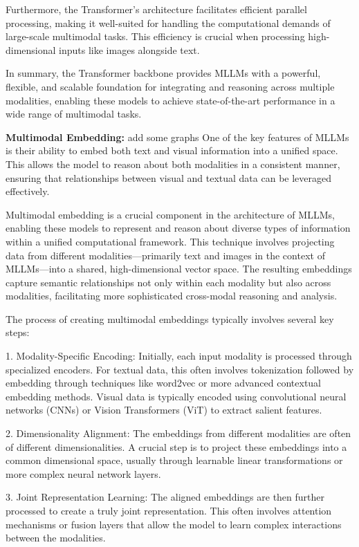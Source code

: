 Furthermore, the Transformer's architecture facilitates efficient parallel processing, making it well-suited for handling the computational demands of large-scale multimodal tasks. This efficiency is crucial when processing high-dimensional inputs like images alongside text.

In summary, the Transformer backbone provides MLLMs with a powerful, flexible, and scalable foundation for integrating and reasoning across multiple modalities, enabling these models to achieve state-of-the-art performance in a wide range of multimodal tasks.

\textbf{Multimodal Embedding:} {\color{red}add some graphs} One of the key features of MLLMs is their ability to embed both text and visual information into a unified space. This allows the model to reason about both modalities in a consistent manner, ensuring that relationships between visual and textual data can be leveraged effectively.

Multimodal embedding is a crucial component in the architecture of MLLMs, enabling these models to represent and reason about diverse types of information within a unified computational framework. This technique involves projecting data from different modalities—primarily text and images in the context of MLLMs—into a shared, high-dimensional vector space. The resulting embeddings capture semantic relationships not only within each modality but also across modalities, facilitating more sophisticated cross-modal reasoning and analysis.

The process of creating multimodal embeddings typically involves several key steps:

1. Modality-Specific Encoding: Initially, each input modality is processed through specialized encoders. For textual data, this often involves tokenization followed by embedding through techniques like word2vec or more advanced contextual embedding methods. Visual data is typically encoded using convolutional neural networks (CNNs) or Vision Transformers (ViT) to extract salient features.

2. Dimensionality Alignment: The embeddings from different modalities are often of different dimensionalities. A crucial step is to project these embeddings into a common dimensional space, usually through learnable linear transformations or more complex neural network layers.

3. Joint Representation Learning: The aligned embeddings are then further processed to create a truly joint representation. This often involves attention mechanisms or fusion layers that allow the model to learn complex interactions between the modalities.

